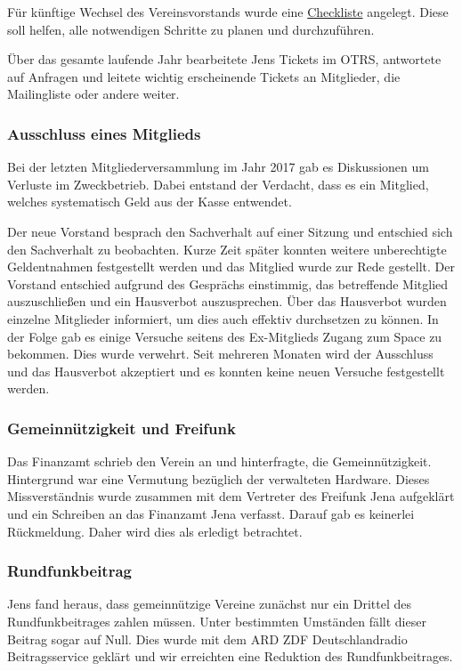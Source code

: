 \documentclass[ngerman]{scrartcl}
\begin{document}
Für künftige Wechsel des Vereinsvorstands wurde eine
\href{https://kraut.space/hswiki:anleitungen:vorstandswechsel}{Checkliste}
angelegt. Diese soll helfen, alle notwendigen Schritte zu planen und
durchzuführen.

Über das gesamte laufende Jahr bearbeitete Jens Tickets im OTRS, antwortete auf
Anfragen und leitete wichtig erscheinende Tickets an Mitglieder, die
Mailingliste oder andere weiter.

\subsubsection{Ausschluss eines Mitglieds}

Bei der letzten Mitgliederversammlung im Jahr 2017 gab es Diskussionen um
Verluste im Zweckbetrieb. Dabei entstand der Verdacht, dass es ein Mitglied,
welches systematisch Geld aus der Kasse entwendet.

Der neue Vorstand besprach den Sachverhalt auf einer Sitzung und entschied sich
den Sachverhalt zu beobachten. Kurze Zeit später konnten weitere unberechtigte
Geldentnahmen festgestellt werden und das Mitglied wurde zur Rede
gestellt. Der Vorstand entschied aufgrund des Gesprächs einstimmig, das
betreffende Mitglied auszuschließen und ein Hausverbot auszusprechen. Über das
Hausverbot wurden einzelne Mitglieder informiert, um dies auch effektiv
durchsetzen zu können. In der Folge gab es einige Versuche seitens des
Ex-Mitglieds Zugang zum Space zu bekommen. Dies wurde verwehrt. Seit mehreren
Monaten wird der Ausschluss und das Hausverbot akzeptiert und es konnten keine
neuen Versuche festgestellt werden.

\subsubsection{Gemeinnützigkeit und Freifunk}

Das Finanzamt schrieb den Verein an und hinterfragte, die
Gemeinnützigkeit. Hintergrund war eine Vermutung bezüglich der verwalteten
Hardware. Dieses Missverständnis wurde zusammen mit dem Vertreter des Freifunk
Jena aufgeklärt und ein Schreiben an das Finanzamt Jena verfasst. Darauf gab es
keinerlei Rückmeldung. Daher wird dies als erledigt betrachtet.

\subsubsection{Rundfunkbeitrag}

Jens fand heraus, dass gemeinnützige Vereine zunächst nur ein Drittel des
Rundfunkbeitrages zahlen müssen. Unter bestimmten Umständen fällt dieser Beitrag
sogar auf Null. Dies wurde mit dem ARD ZDF Deutschlandradio Beitragsservice
geklärt und wir erreichten eine Reduktion des Rundfunkbeitrages.
\end{document}
